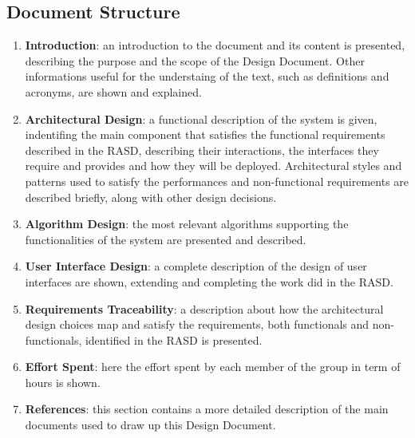 \subsection{Document Structure}

\begin{enumerate}
	\item \textbf{Introduction}: an introduction to the document and its content is presented, describing the purpose and the scope of the Design Document. Other informations useful for the understaing of the text, such as definitions and acronyms, are shown and explained.
	\item \textbf{Architectural Design}: a functional description of the system is given, indentifing the main component that satisfies the functional requirements described in the RASD, describing their interactions, the interfaces they require and provides and how they will be deployed.
Architectural styles and patterns used to satisfy the performances and non-functional requirements are described briefly, along with other design decisions.
	\item \textbf{Algorithm Design}: the most relevant algorithms supporting the functionalities of the system are presented and described.
	\item \textbf{User Interface Design}: a complete description of the design of user interfaces are shown, extending and completing the work did in the RASD.
	\item \textbf{Requirements Traceability}: a description about how the architectural design choices map and satisfy the requirements, both functionals and non-functionals, identified in the RASD is presented.
	\item \textbf{Effort Spent}: here the effort spent by each member of the group in term of hours is shown.
	\item \textbf{References}: this section contains a more detailed description of the main documents used to draw up this Design Document.
\end{enumerate}
